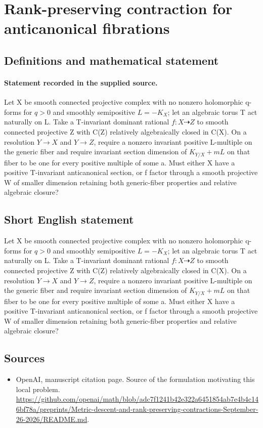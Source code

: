 \documentclass[11pt]{article}
\begin{document}
\section*{Rank-preserving contraction for anticanonical fibrations}\label{30007011}
\subsection{Definitions and mathematical statement}
\paragraph{Statement recorded in the supplied source.}
Let X be smooth connected projective complex with no nonzero holomorphic q-forms for $q>0$ and smoothly semipositive $L=-K_X$; let an algebraic torus T act naturally on L. Take a T-invariant dominant rational $f:X\dashrightarrow Z$ to smooth connected projective Z with C(Z) relatively algebraically closed in C(X). On a resolution $Y\to X$ and $Y\to Z$, require a nonzero invariant positive L-multiple on the generic fiber and require invariant section dimension of $K_{Y/X}+mL$ on that fiber to be one for every positive multiple of some a. Must either X have a positive T-invariant anticanonical section, or f factor through a smooth projective W of smaller dimension retaining both generic-fiber properties and relative algebraic closure?
\subsection{Short English statement}
Let X be smooth connected projective complex with no nonzero holomorphic q-forms for $q>0$ and smoothly semipositive $L=-K_X$; let an algebraic torus T act naturally on L. Take a T-invariant dominant rational $f:X\dashrightarrow Z$ to smooth connected projective Z with C(Z) relatively algebraically closed in C(X). On a resolution $Y\to X$ and $Y\to Z$, require a nonzero invariant positive L-multiple on the generic fiber and require invariant section dimension of $K_{Y/X}+mL$ on that fiber to be one for every positive multiple of some a. Must either X have a positive T-invariant anticanonical section, or f factor through a smooth projective W of smaller dimension retaining both generic-fiber properties and relative algebraic closure?
\subsection{Sources}
\begin{itemize}
\item[S1] OpenAI, manuscript citation page. Source of the formulation motivating this local problem.
\url{https://github.com/openai/math/blob/adc7f1241b42e322a6451854ab7e4b4c146bf78a/preprints/Metric-descent-and-rank-preserving-contractions-September-26-2026/README.md}.
\end{itemize}
\end{document}
